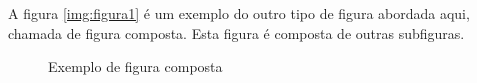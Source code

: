 A figura \ref{img:figura1} é um exemplo do outro tipo de figura abordada aqui, chamada de figura composta. Esta figura é composta de outras subfiguras.
\begin{figure}[!htb]
\centering
    \caption{\label{img:figura1} Exemplo de figura composta}
    \qquad
    \vspace{1.5em}
\label{fig:dag}
\end{figure}

